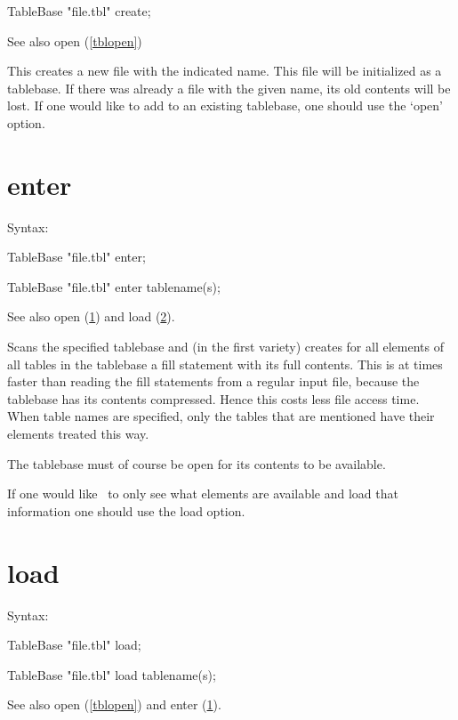 TableBase "file.tbl" create;

\noindent See also open (\ref{tblopen})

\noindent This creates a new file with the 
indicated name. This file will be initialized as a tablebase. If there was 
already a file with the given name, its old contents will be lost. If one 
would like to add to an existing tablebase, one should use the 
`open' option.


\section{enter}
\label{tblenter}

\noindent Syntax:

TableBase "file.tbl" enter;

TableBase "file.tbl" enter tablename(s);

\noindent See also open (\ref{tblenter}) and load (\ref{tblload}).

\noindent Scans the specified tablebase and (in the first 
variety) creates for all elements of all tables in the tablebase a 
fill statement with its full contents. This is at times faster 
than reading the fill statements from a regular input 
file, because the tablebase has its contents 
compressed. 
Hence this costs less file access time. When table names are specified, 
only the tables that are mentioned have their elements treated this way.

\noindent The tablebase must of course be open for its contents to be 
available.

\noindent If one would like \FORM\ to only see what elements are available 
and load that information one should use the load option.


\section{load}
\label{tblload}

\noindent Syntax:

TableBase "file.tbl" load;

TableBase "file.tbl" load tablename(s);

\noindent See also open (\ref{tblopen}) and enter (\ref{tblenter}).

